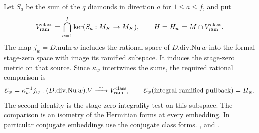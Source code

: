 Let \(S_a\) be the sum of the \(q\) diamonds in direction \(a\)
for \(1\le a\le f\), and put
\[
 V_{\rm ram}^{\rm class}=\bigcap_{a=1}^f\ker(S_a:M_K\to M_K),
 \qquad H=H_w=M\cap V_{\rm ram}^{\rm class}.
\]
The map \(j_w=D.\mathrm{nuIn}\,w\) includes the rational
space of \(D.\mathrm{div}.\mathrm{Nu}\,w\) into the formal
stage-zero space with image its ramified subspace. It induces
the stage-zero metric on that source. Since \(\kappa_w\)
intertwines the sums, the required rational comparison is
\begin{equation}
\label{eq:selected-donor-isometry}
 \mathcal E_w=\kappa_w^{-1}j_w:
     (D.\mathrm{div}.\mathrm{Nu}\,w).V
           \xrightarrow{\ \sim\ } V_{\rm ram}^{\rm class},
 \qquad
 \mathcal E_w(\text{\rm integral ramified pullback})=H_w .
\end{equation}
The second identity is the stage-zero integrality test on this
subspace. The comparison is an isometry of the Hermitian forms
at every embedding. In particular conjugate embeddings use the
conjugate class forms.
,
 and
.


